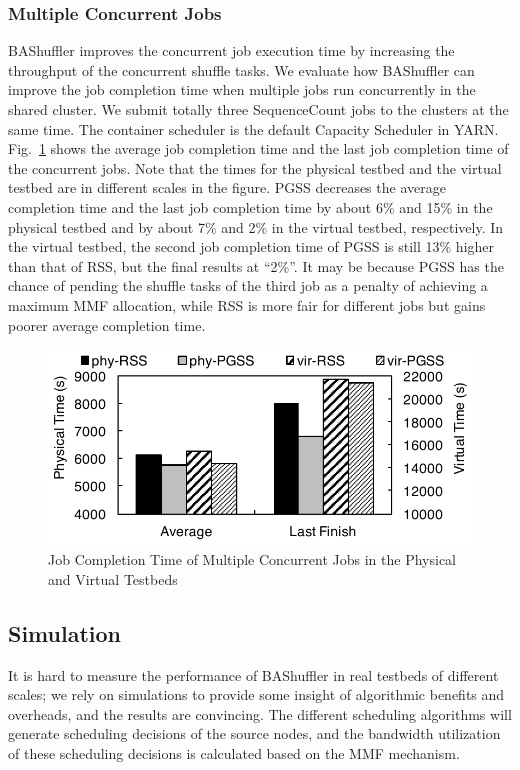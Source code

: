 \documentclass[10pt,journal,compsoc]{IEEEtran}
\begin{document}
\subsubsection{Multiple Concurrent Jobs}
BAShuffler improves the concurrent job execution time by increasing
the throughput of the concurrent shuffle tasks.
We evaluate how BAShuffler can improve the job completion time when
multiple jobs run concurrently in the shared cluster.
We submit totally three SequenceCount jobs to the clusters at the same time.
The container scheduler is the default Capacity Scheduler in YARN. 
Fig.~\ref{fig:r_concurrent} shows the average job completion time and
the last job completion time of the concurrent jobs.
Note that the times for the physical testbed and the virtual testbed
are in different scales in the figure.
PGSS decreases the average completion time and the last job
completion time by about 6\% and 15\% in the physical testbed 
and by about 7\% and 2\% in the virtual testbed, respectively. 
In the virtual testbed, the second job completion time of PGSS is still 13\% higher than that of RSS, but the final results at ``2\%''.
It may be because PGSS has the chance of pending the shuffle tasks of the third job as a penalty of achieving a maximum MMF allocation, 
while RSS is more fair for different jobs but gains poorer average completion time. 


\begin{figure}[!t]
\centering
\includegraphics[width=0.9\columnwidth,height=0.4\columnwidth]{figure12}
\caption{Job Completion Time of Multiple Concurrent Jobs in the Physical and Virtual Testbeds}
\label{fig:r_concurrent}
\end{figure}


\subsection{Simulation}
It is hard to measure the performance of BAShuffler in real
testbeds of different scales; we rely on
simulations to provide some insight of algorithmic benefits and
overheads, and the results are convincing.  %
The different scheduling algorithms will generate scheduling decisions
of the source nodes,
and the bandwidth utilization of these scheduling
decisions is calculated based on the MMF mechanism.
\end{document}
